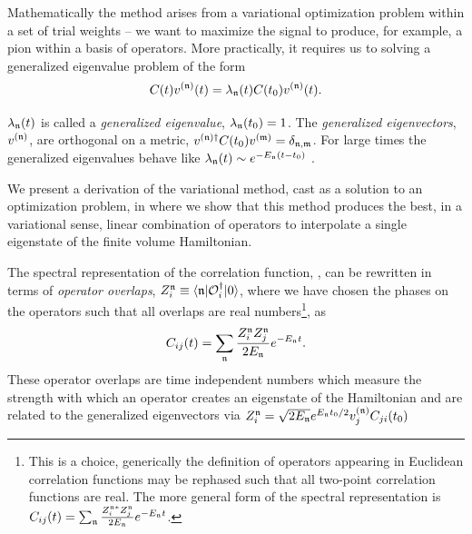 Mathematically the method arises from a variational optimization problem within a set of trial weights -- we want to maximize the signal to produce, for example, a pion within a basis of operators. More practically, it requires us to solving a generalized eigenvalue problem of the form 
\begin{equation}
C(t)v^{(\mathfrak{n})}(t) = \lambda_{\mathfrak{n}}(t) C(t_0) v^{(\mathfrak{n})}(t). \label{eqn::GEVP}
\end{equation}

$\lambda_{\mathfrak{n}}(t)$ is called a \emph{generalized eigenvalue}, $\lambda_{\mathfrak{n}}(t_0) = 1$. The \emph{generalized eigenvectors}, $v^{(\mathfrak{n})}$, are orthogonal on a metric, $v^{(\mathfrak{n})\dagger} C(t_0) v^{(\mathfrak{m})} = \delta_{\mathfrak{n},\mathfrak{m}}$. For large times the generalized eigenvalues behave like $\lambda_{\mathfrak{n}}(t) \sim e^{-E_{\mathfrak{n}}(t-t_0)}$ \cite{Blossier:2009kd,Luscher:1990ck}. 

We present a derivation of the variational method, cast as a solution to an optimization problem, in  where we show that this method produces the best, in a variational sense, linear combination of operators to interpolate a single eigenstate of the finite volume Hamiltonian. 

The spectral representation of the correlation function, , can be rewritten in terms of  \emph{operator overlaps}, $Z_i^{\mathfrak{n}} \equiv \langle \mathfrak{n} | \mathcal{O}^\dagger_i | 0 \rangle$, where we have chosen the phases on the operators such that all overlaps are real numbers\footnote{This is a choice, generically the definition of operators appearing in Euclidean correlation functions may be rephased such that all two-point correlation functions are real. The more general form of the spectral representation is $C_{ij}(t) = \sum_{\mathfrak{n}} \frac{Z_i^{\mathfrak{n}*}Z_j^{\mathfrak{n}}}{2E_{\mathfrak{n}}} e^{-E_{\mathfrak{n}}t}$.}, as 
\begin{equation}
C_{ij}(t) = \sum_{\mathfrak{n}} \frac{Z_i^{\mathfrak{n}}Z_j^{\mathfrak{n}}}{2E_{\mathfrak{n}}} e^{-E_{\mathfrak{n}}t} \label{eqn::spec_rep_2}.
\end{equation}
These operator overlaps are time independent numbers which measure the strength with which an operator creates an eigenstate of the Hamiltonian and are related to the generalized eigenvectors via $Z_i^{\mathfrak{n}} = \sqrt{2E_{\mathfrak{n}}} e^{E_{\mathfrak{n}}t_0/2} v^{(\mathfrak{n})}_j C_{ji}(t_0)$

